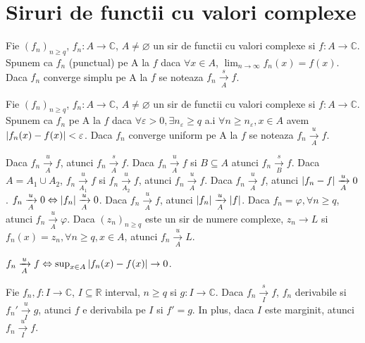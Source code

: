 \documentclass{article}
\begin{document}
\section{Siruri de functii cu valori complexe}
\begin{enumerate}

   Fie $(f_n)_{n \geq q}$, $f_n : A \to \mathbb{C}$, $A \neq \varnothing$ un sir de functii cu valori complexe si $f : A \to \mathbb{C}$. Spunem ca $f_n$  (punctual) pe A la $f$ daca $\forall x \in A$, $\lim_{n \to \infty} f_n(x) = f(x)$.
\notatie Daca $f_n$ converge simplu pe A la $f$ se noteaza $f_n \xrightarrow[A]{s} f$.

 Fie $(f_n)_{n \geq q}$, $f_n : A \to \mathbb{C}$, $A \neq \varnothing$ un sir de functii cu valori complexe si $f : A \to \mathbb{C}$. Spunem ca $f_n$  pe A la $f$ daca $\forall \varepsilon > 0, \exists n_{\varepsilon} \geq q$ a.i $\forall n \geq n_{\varepsilon}, x \in A$ avem $\left\lvert f_n(x) - f(x) \right\rvert < \varepsilon$.
\notatie Daca $f_n$ converge uniform pe A la $f$ se noteaza $f_n \xrightarrow[A]{u} f$.

\proprietate Daca $f_n \xrightarrow[A]{u} f$, atunci $f_n \xrightarrow[A]{s} f$.
\proprietate Daca $f_n \xrightarrow[A]{u} f$ si $B \subseteq A$ atunci $f_n \xrightarrow[B]{s} f$.
\proprietate Daca $A = A_1 \cup A_2$, $f_n \xrightarrow[A_1]{u} f$ si $f_n \xrightarrow[A_2]{u} f$, atunci $f_n \xrightarrow[A]{u} f$.
\proprietate Daca $f_n \xrightarrow[A]{u} f$, atunci $\left\lvert f_n - f \right\rvert \xrightarrow[A]{u} 0$.
\proprietate $f_n \xrightarrow[A]{u} 0 \Leftrightarrow \left\lvert f_n \right\rvert \xrightarrow[A]{u} 0$.
\proprietate Daca $f_n \xrightarrow[A]{u} f$, atunci $\left\lvert f_n \right\rvert \xrightarrow[A]{u} \left\lvert f \right\rvert$.
\proprietate Daca $f_n = \varphi, \forall n \geq q$, atunci $f_n \xrightarrow[A]{u} \varphi$.
\proprietate Daca $(z_n)_{n \geq q}$ este un sir de numere complexe, $z_n \to L$ si $f_n(x) = z_n, \forall n \geq q, x \in A$, atunci $f_n \xrightarrow[A]{u} L$.

\begin{tcolorbox}
\proprietate $f_n \xrightarrow[A]{u} f \Leftrightarrow \sup_{x \in A}  \left\lvert f_n(x) - f(x) \right\rvert \to 0$.
\end{tcolorbox}

\proprietate Fie $f_n, f : I \to \mathbb{C}$, $I \subseteq \mathbb{R}$ interval, $n \geq q$ si $g : I \to \mathbb{C}$. Daca $f_n \xrightarrow[I]{s} f$, $f_n$ derivabile si $f_n' \xrightarrow[I]{u} g$, atunci $f$ e derivabila pe $I$ si $f' = g$. In plus, daca $I$ este marginit, atunci $f_n \xrightarrow[I]{u} f$.


\end{enumerate}
\end{document}
